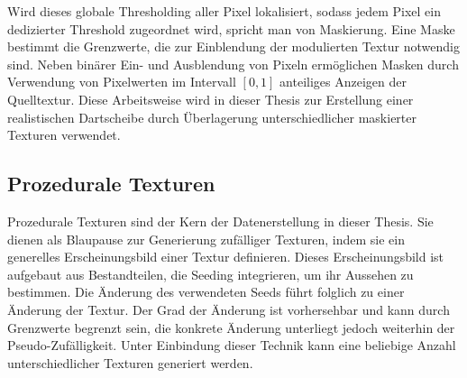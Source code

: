 Wird dieses globale Thresholding aller Pixel lokalisiert, sodass jedem Pixel ein dedizierter Threshold zugeordnet wird, spricht man von Maskierung. Eine Maske bestimmt die Grenzwerte, die zur Einblendung der modulierten Textur notwendig sind. Neben binärer Ein- und Ausblendung von Pixeln ermöglichen Masken durch Verwendung von Pixelwerten im Intervall $[0, 1]$ anteiliges Anzeigen der Quelltextur. Diese Arbeitsweise wird in dieser Thesis zur Erstellung einer realistischen Dartscheibe durch Überlagerung unterschiedlicher maskierter Texturen verwendet.



\subsection{Prozedurale Texturen}
\label{sec:was_prozedurale_texturen}

Prozedurale Texturen sind der Kern der Datenerstellung in dieser Thesis. Sie dienen als Blaupause zur Generierung zufälliger Texturen, indem sie ein generelles Erscheinungsbild einer Textur definieren. Dieses Erscheinungsbild ist aufgebaut aus Bestandteilen, die Seeding integrieren, um ihr Aussehen zu bestimmen. Die Änderung des verwendeten Seeds führt folglich zu einer Änderung der Textur. Der Grad der Änderung ist vorhersehbar und kann durch Grenzwerte begrenzt sein, die konkrete Änderung unterliegt jedoch weiterhin der Pseudo-Zufälligkeit. Unter Einbindung dieser Technik kann eine beliebige Anzahl unterschiedlicher Texturen generiert werden.
